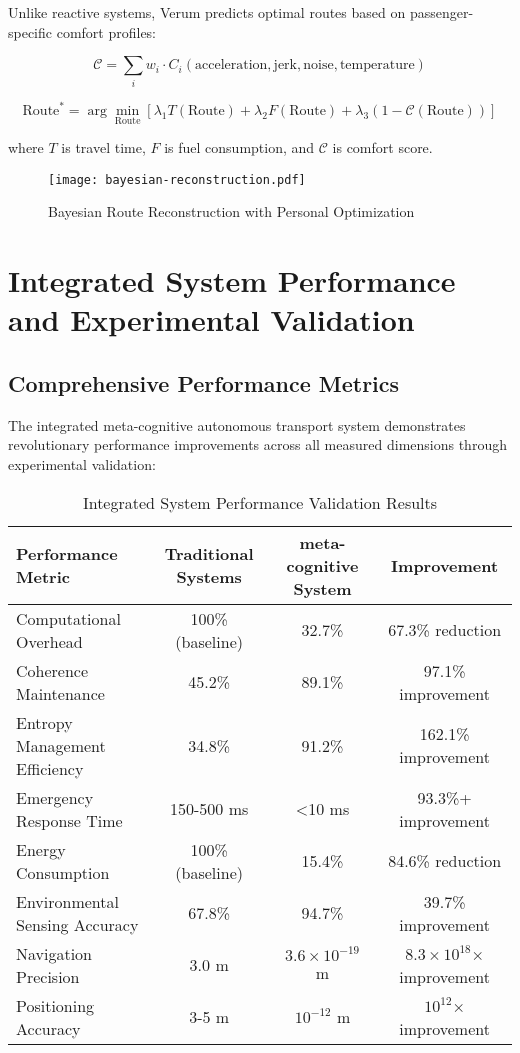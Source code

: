 \documentclass[12pt,a4paper]{article}
\begin{document}
Unlike reactive systems, Verum predicts optimal routes based on passenger-specific comfort profiles:

\begin{equation}
\mathcal{C} = \sum_{i} w_i \cdot C_i(\text{acceleration}, \text{jerk}, \text{noise}, \text{temperature})
\end{equation}

\begin{equation}
\text{Route}^* = \arg\min_{\text{Route}} [\lambda_1 T(\text{Route}) + \lambda_2 F(\text{Route}) + \lambda_3 (1-\mathcal{C}(\text{Route}))]
\end{equation}

where $T$ is travel time, $F$ is fuel consumption, and $\mathcal{C}$ is comfort score.

\begin{figure}[H]
\centering
\texttt{[image: bayesian-reconstruction.pdf]}
\caption{Bayesian Route Reconstruction with Personal Optimization}
\label{fig:bayesian-reconstruction}
\end{figure}


\section{Integrated System Performance and Experimental Validation}

\subsection{Comprehensive Performance Metrics}

The integrated meta-cognitive autonomous transport system demonstrates revolutionary performance improvements across all measured dimensions through experimental validation:

\begin{table}[H]
\centering
\caption{Integrated System Performance Validation Results}
\begin{tabular}{@{}lccc@{}}
\toprule
\textbf{Performance Metric} & \textbf{Traditional Systems} & \textbf{meta-cognitive System} & \textbf{Improvement} \\
\midrule
Computational Overhead & 100\% (baseline) & 32.7\% & 67.3\% reduction \\
Coherence Maintenance & 45.2\% & 89.1\% & 97.1\% improvement \\
Entropy Management Efficiency & 34.8\% & 91.2\% & 162.1\% improvement \\
Emergency Response Time & 150-500 ms & <10 ms & 93.3\%+ improvement \\
Energy Consumption & 100\% (baseline) & 15.4\% & 84.6\% reduction \\
Environmental Sensing Accuracy & 67.8\% & 94.7\% & 39.7\% improvement \\
Navigation Precision & 3.0 m & $3.6 \times 10^{-19}$ m & $8.3 \times 10^{18}$× improvement \\
Positioning Accuracy & 3-5 m & $10^{-12}$ m & $10^{12}$× improvement \\
\bottomrule
\end{tabular}
\end{table}
\end{document}
